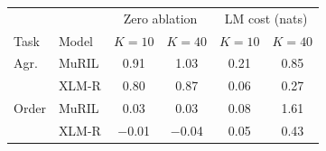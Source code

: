 \begin{tabular}{@{}llcccc@{}}
\toprule
 & & \multicolumn{2}{c}{Zero ablation} & \multicolumn{2}{c}{LM cost (nats)} \\
Task & Model & $K=10$ & $K=40$ & $K=10$ & $K=40$ \\
\midrule
Agr. & MuRIL & 0.91 & 1.03 & 0.21 & 0.85 \\
 & XLM-R & 0.80 & 0.87 & 0.06 & 0.27 \\
Order & MuRIL & 0.03 & 0.03 & 0.08 & 1.61 \\
 & XLM-R & $-$0.01 & $-$0.04 & 0.05 & 0.43 \\
\bottomrule
\end{tabular}
